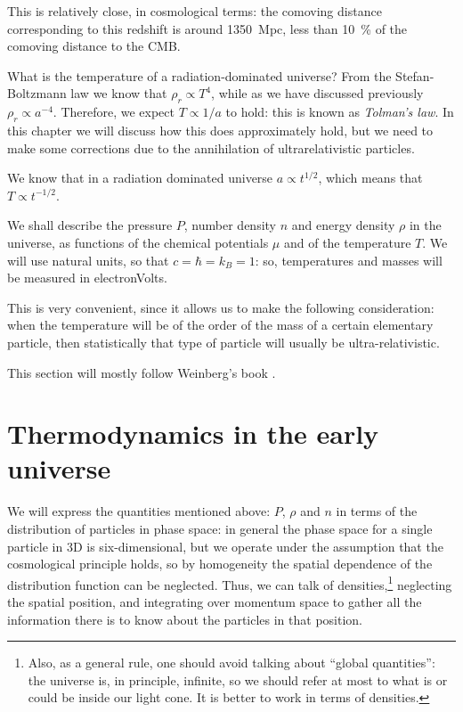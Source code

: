\documentclass[main.tex]{subfiles}
\begin{document}
This is relatively close, in cosmological terms: the comoving distance corresponding to this redshift is around \SI{1350}{Mpc}, less than \SI{10}{\percent} of the comoving distance to the CMB. 


What is the temperature of a radiation-dominated universe?
From the Stefan-Boltzmann law we know that \(\rho _r \propto T^{4}\), while as we have discussed previously \(\rho _r \propto a^{-4}\).
Therefore, we expect \(T \propto 1/a\) to hold: this is known as \emph{Tolman's law}.
In this chapter we will discuss how this does approximately hold, but we need to make some corrections due to the annihilation of ultrarelativistic particles.

We know that in a radiation dominated universe \(a \propto t^{1/2}\), which means that \(T \propto t^{-1/2}\).

We shall describe the pressure \(P\), number density \(n\) and energy density \(\rho  \) in the universe, as functions of the chemical potentials \(\mu \) and of  the temperature \(T\).
We will use natural units, so that \(c= \hbar = k_B = 1\): so, temperatures and masses will be measured in electronVolts. 

This is very convenient, since it allows us to make the following consideration: when the temperature will be of the order of the mass of a certain elementary particle, then statistically that type of particle will usually be ultra-relativistic.

This section will mostly follow Weinberg's book \cite[page 538, section 15.6]{weinbergGravitationCosmologyPrinciples1972}.

\section{Thermodynamics in the early universe}

We will express the quantities mentioned above: \(P\), \(\rho \) and \(n\) in terms of the distribution of particles in phase space: in general the phase space for a single particle in 3D is six-dimensional, but we operate under the assumption that the cosmological principle holds, so by homogeneity the spatial dependence of the distribution function can be neglected. 
Thus, we can talk of densities,\footnote{Also, as a general rule, one should avoid talking about ``global quantities'': the universe is, in principle, infinite, so we should refer at most to what is or could be inside our light cone. It is better to work in terms of densities.} neglecting the spatial position, and integrating over momentum space to gather all the information there is to know about the particles in that position.
\end{document}
